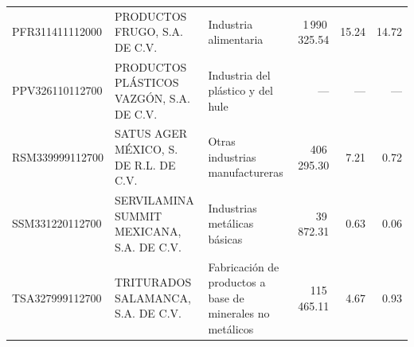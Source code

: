 {\begin{longtable}{@{}L{.16\textwidth} L{.25\textwidth} L{.19\textwidth} r r r@{}}
PFR311411112000 & PRODUCTOS FRUGO, S.A. DE C.V. &
Industria alimentaria & 1\,990\,325.54 & 15.24 & 14.72 \\
PPV326110112700 & PRODUCTOS PLÁSTICOS VAZGÓN, S.A. DE C.V. &
Industria del plástico y del hule & --- & --- & --- \\
RSM339999112700 & SATUS AGER MÉXICO, S. DE R.L. DE C.V. &
Otras industrias manufactureras & 406\,295.30 & 7.21 & 0.72 \\
SSM331220112700 & SERVILAMINA SUMMIT MEXICANA, S.A. DE C.V. &
Industrias metálicas básicas & 39\,872.31 & 0.63 & 0.06 \\
TSA327999112700 & TRITURADOS SALAMANCA, S.A. DE C.V. &
Fabricación de productos a base de minerales no metálicos &
115\,465.11 & 4.67 & 0.93 \\
\end{longtable}}

